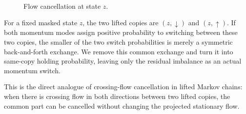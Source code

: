 \documentclass{article}
\numberwithin{theorem}{section}
\numberwithin{proposition}{section}
\numberwithin{corollary}{section}
\numberwithin{lemma}{section}
\numberwithin{conjecture}{section}
\numberwithin{remark}{section}
\numberwithin{definition}{section}
\numberwithin{assumption}{section}
\numberwithin{example}{section}
\begin{document}
\begin{figure}
\vspace{-0.6em}
\centering
{}
\caption{Flow cancellation at state $z$.}
\label{fig:flow_cancelled_switch}
\end{figure}

For a fixed masked state $z$, the two lifted copies are $(z,\downarrow)$ and $(z,\uparrow)$. If both momentum modes assign positive probability to switching between these two copies, the smaller of the two switch probabilities is merely a symmetric back-and-forth exchange. We remove this common exchange and turn it into same-copy holding probability, leaving only the residual imbalance as an actual momentum switch.

This is the direct analogue of crossing-flow cancellation in lifted Markov chains: when there is crossing flow in both directions between two lifted copies, the common part can be cancelled without changing the projected stationary flow.
\end{document}
